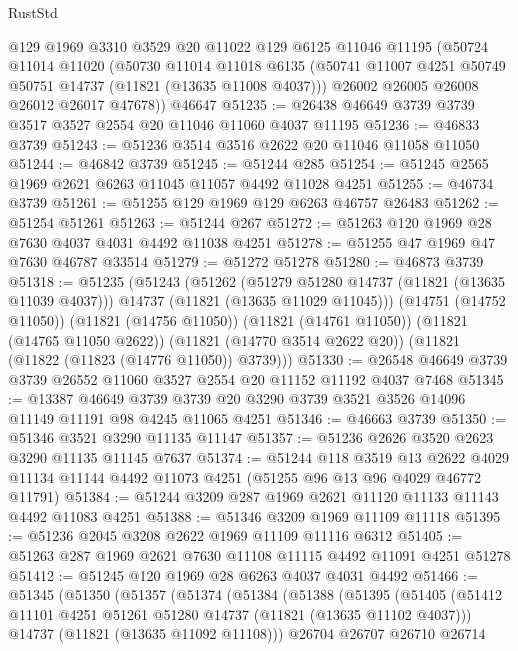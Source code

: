 \begin{lexlean}{RustStd}
\begin{coremodule}
    @129
    @1969
    @3310
    @3529
    @20
    @11022
    @129
    @6125
    @11046
    @11195
    (@50724
      @11014
      @11020
      (@50730
        @11014
        @11018
        @6135
        (@50741 @11007 @4251 @50749 @50751 @14737 (@11821 (@13635 @11008 @4037)))
        @26002
        @26005
        @26008
        @26012
        @26017
        @47678))
    @46647
@51235 := @26438 @46649 @3739 @3739 @3517 @3527 @2554 @20 @11046 @11060 @4037 @11195
@51236 := @46833 @3739
@51243 := @51236 @3514 @3516 @2622 @20 @11046 @11058 @11050
@51244 := @46842 @3739
@51245 := @51244 @285
@51254 := @51245 @2565 @1969 @2621 @6263 @11045 @11057 @4492 @11028 @4251
@51255 := @46734 @3739
@51261 := @51255 @129 @1969 @129 @6263 @46757 @26483
@51262 := @51254 @51261
@51263 := @51244 @267
@51272 := @51263 @120 @1969 @28 @7630 @4037 @4031 @4492 @11038 @4251
@51278 := @51255 @47 @1969 @47 @7630 @46787 @33514
@51279 := @51272 @51278
@51280 := @46873 @3739
@51318 := @51235
    (@51243
      (@51262
        (@51279 @51280 @14737 (@11821 (@13635 @11039 @4037)))
        @14737
        (@11821 (@13635 @11029 @11045)))
      (@14751 (@14752 @11050))
      (@11821 (@14756 @11050))
      (@11821 (@14761 @11050))
      (@11821 (@14765 @11050 @2622))
      (@11821 (@14770 @3514 @2622 @20))
      (@11821 (@11822 (@11823 (@14776 @11050)) @3739)))
@51330 := @26548 @46649 @3739 @3739 @26552 @11060 @3527 @2554 @20 @11152 @11192 @4037 @7468
@51345 := @13387
    @46649
    @3739
    @3739
    @20
    @3290
    @3739
    @3521
    @3526
    @14096
    @11149
    @11191
    @98
    @4245
    @11065
    @4251
@51346 := @46663 @3739
@51350 := @51346 @3521 @3290 @11135 @11147
@51357 := @51236 @2626 @3520 @2623 @3290 @11135 @11145 @7637
@51374 := @51244
    @118
    @3519
    @13
    @2622
    @4029
    @11134
    @11144
    @4492
    @11073
    @4251
    (@51255 @96 @13 @96 @4029 @46772 @11791)
@51384 := @51244 @3209 @287 @1969 @2621 @11120 @11133 @11143 @4492 @11083 @4251
@51388 := @51346 @3209 @1969 @11109 @11118
@51395 := @51236 @2045 @3208 @2622 @1969 @11109 @11116 @6312
@51405 := @51263 @287 @1969 @2621 @7630 @11108 @11115 @4492 @11091 @4251 @51278
@51412 := @51245 @120 @1969 @28 @6263 @4037 @4031 @4492
@51466 := @51345
    (@51350
      (@51357
        (@51374
          (@51384
            (@51388
              (@51395
                (@51405
                  (@51412 @11101 @4251 @51261 @51280 @14737 (@11821 (@13635 @11102 @4037)))
                  @14737
                  (@11821 (@13635 @11092 @11108)))
                @26704
                @26707
                @26710
                @26714

\end{coremodule}
\end{lexlean}
